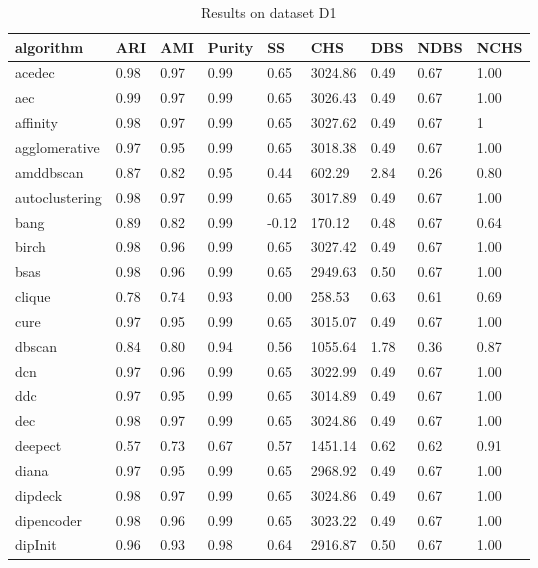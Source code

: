 \begin{table}[H]
\centering
\caption{Results on dataset D1}
\label{tab:params:D1}
\begin{tabular}{|l|l|l|l|l|l|l|l|l|}
\hline
algorithm & ARI & AMI & Purity & SS & CHS & DBS & NDBS & NCHS \\
\hline
acedec & 0.98 & 0.97 & 0.99 & 0.65 & 3024.86 & 0.49 & 0.67 & 1.00 \\
\hline
aec & 0.99 & 0.97 & 0.99 & 0.65 & 3026.43 & 0.49 & 0.67 & 1.00 \\
\hline
affinity & 0.98 & 0.97 & 0.99 & 0.65 & 3027.62 & 0.49 & 0.67 & 1 \\
\hline
agglomerative & 0.97 & 0.95 & 0.99 & 0.65 & 3018.38 & 0.49 & 0.67 & 1.00 \\
\hline
amddbscan & 0.87 & 0.82 & 0.95 & 0.44 & 602.29 & 2.84 & 0.26 & 0.80 \\
\hline
autoclustering & 0.98 & 0.97 & 0.99 & 0.65 & 3017.89 & 0.49 & 0.67 & 1.00 \\
\hline
bang & 0.89 & 0.82 & 0.99 & -0.12 & 170.12 & 0.48 & 0.67 & 0.64 \\
\hline
birch & 0.98 & 0.96 & 0.99 & 0.65 & 3027.42 & 0.49 & 0.67 & 1.00 \\
\hline
bsas & 0.98 & 0.96 & 0.99 & 0.65 & 2949.63 & 0.50 & 0.67 & 1.00 \\
\hline
clique & 0.78 & 0.74 & 0.93 & 0.00 & 258.53 & 0.63 & 0.61 & 0.69 \\
\hline
cure & 0.97 & 0.95 & 0.99 & 0.65 & 3015.07 & 0.49 & 0.67 & 1.00 \\
\hline
dbscan & 0.84 & 0.80 & 0.94 & 0.56 & 1055.64 & 1.78 & 0.36 & 0.87 \\
\hline
dcn & 0.97 & 0.96 & 0.99 & 0.65 & 3022.99 & 0.49 & 0.67 & 1.00 \\
\hline
ddc & 0.97 & 0.95 & 0.99 & 0.65 & 3014.89 & 0.49 & 0.67 & 1.00 \\
\hline
dec & 0.98 & 0.97 & 0.99 & 0.65 & 3024.86 & 0.49 & 0.67 & 1.00 \\
\hline
deepect & 0.57 & 0.73 & 0.67 & 0.57 & 1451.14 & 0.62 & 0.62 & 0.91 \\
\hline
diana & 0.97 & 0.95 & 0.99 & 0.65 & 2968.92 & 0.49 & 0.67 & 1.00 \\
\hline
dipdeck & 0.98 & 0.97 & 0.99 & 0.65 & 3024.86 & 0.49 & 0.67 & 1.00 \\
\hline
dipencoder & 0.98 & 0.96 & 0.99 & 0.65 & 3023.22 & 0.49 & 0.67 & 1.00 \\
\hline
dipInit & 0.96 & 0.93 & 0.98 & 0.64 & 2916.87 & 0.50 & 0.67 & 1.00 \\

\end{tabular}
\end{table}
